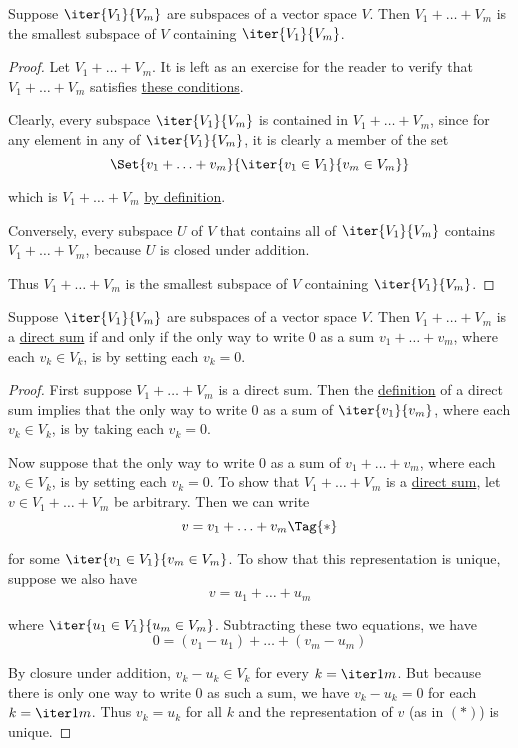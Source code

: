 \label{ddb0ddb}

Suppose $\iter{V_1}{V_m}$ are subspaces of a vector space $V$. Then
\href{d7c30bb}{$V_1+\ldots+V_m$} is the smallest subspace of $V$ containing
$\iter{V_1}{V_m}$.

\begin{proof}
  Let $V_1+\ldots+V_m$. It is left as an exercise for the reader to verify
  that $V_1+\ldots+V_m$ satisfies \href{dea139b}{these conditions}.

  Clearly, every subspace $\iter{V_1}{V_m}$ is contained in $V_1+\ldots+V_m$,
  since for any element in any of $\iter{V_1}{V_m}$, it is clearly a member of
  the set
  $$
    \Set{v_1+\ldots+v_m}{\iter{v_1\in V_1}{v_m\in V_m}}
  $$

  which is $V_1+\ldots+V_m$ \href{d7c30bb}{by definition}.

  Conversely, every subspace $U$ of $V$ that contains all of $\iter{V_1}{V_m}$
  contains $V_1+\ldots+V_m$, because $U$ is closed under addition.

  Thus $V_1+\ldots+V_m$ is the smallest subspace of $V$ containing
  $\iter{V_1}{V_m}$.
\end{proof}

\label{ab66b9d}

Suppose $\iter{V_1}{V_m}$ are subspaces of a vector space $V$. Then
$V_1+\ldots+V_m$ is a \href{c67c961}{direct sum} if and only if the only way to
write $0$ as a sum $v_1+\ldots+v_m$, where each $v_k\in V_k$, is by setting
each $v_k=0$.

\begin{proof}
  First suppose $V_1+\ldots+V_m$ is a direct sum. Then the
  \href{c67c961}{definition} of a direct sum implies that the only way to write
  0 as a sum of $\iter{v_1}{v_m}$, where each $v_k\in V_k$, is by taking each
  $v_k=0$.

  Now suppose that the only way to write $0$ as a sum of $v_1+\ldots+v_m$,
  where each $v_k\in V_k$, is by setting each $v_k=0$. To show that
  $V_1+\ldots+V_m$ is a \href{c67c961}{direct sum}, let $v\in V_1+\ldots+V_m$
  be arbitrary. Then we can write
  \begin{equation*}
    v=v_1+\ldots+v_m\Tag{*}
  \end{equation*}

  for some $\iter{v_1\in V_1}{v_m\in V_m}$. To show that this representation is
  unique, suppose we also have
  $$
    v=u_1+\ldots+u_m
  $$

  where $\iter{u_1\in V_1}{u_m\in V_m}$. Subtracting these two equations, we
  have
  $$
    0=(v_1-u_1)+\ldots+(v_m-u_m)
  $$

  By closure under addition, $v_k-u_k\in V_k$ for every $k=\iter1m$. But
  because there is only one way to write $0$ as such a sum, we have $v_k-u_k=0$
  for each $k=\iter1m$. Thus $v_k=u_k$ for all $k$ and the representation of
  $v$ (as in $(*)$) is unique.
\end{proof}

